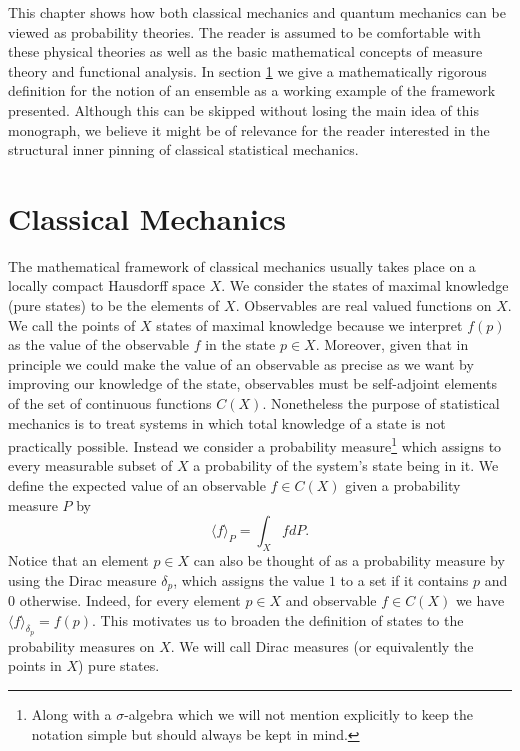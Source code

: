 This chapter shows how both classical mechanics and quantum mechanics can be viewed as probability theories. The reader is assumed to be comfortable with these physical theories as well as the basic mathematical concepts of measure theory and functional analysis. In section \ref{sec:classical_probability} we give a mathematically rigorous definition for the notion of an ensemble as a working example of the framework presented. Although this can be skipped without losing the main idea of this monograph, we believe it might be of relevance for the reader interested in the structural inner pinning of classical statistical mechanics. 

\section{Classical Mechanics}\label{sec:classical_probability}

The mathematical framework of classical mechanics usually takes place on a locally compact Hausdorff space $X$. We consider the states of maximal knowledge (pure states) to be the elements of $X$. Observables are real valued functions on $X$. We call the points of $X$ states of maximal knowledge because we interpret $f(p)$ as the value of the observable $f$ in the state $p\in X$. Moreover, given that in principle we could make the value of an observable as precise as we want by improving our knowledge of the state, observables must be self-adjoint elements of the set of continuous functions $C(X)$. Nonetheless the purpose of statistical mechanics is to treat systems in which total knowledge of a state is not practically possible. Instead we consider a probability measure\footnote{Along with a $\sigma$-algebra which we will not mention explicitly to keep the notation simple but should always be kept in mind.} which assigns to every measurable subset of $X$ a probability of the system's state being in it. We define the expected value of an observable $f\in C(X)$ given a probability measure $P$ by 
\begin{equation}\label{eq:classical_states}
\langle f \rangle_P = \int_X fdP.
\end{equation}  
Notice that an element $p\in X$ can also be thought of as a probability measure by using the Dirac measure $\delta_p$, which assigns the value $1$ to a set if it contains $p$ and $0$ otherwise. Indeed, for every element $p \in X$ and observable $f \in C(X)$ we have $\langle f \rangle_{\delta_p} = f(p)$. This motivates us to broaden the definition of states to the probability measures on $X$. We will call Dirac measures (or equivalently the points in $X$) pure states.

